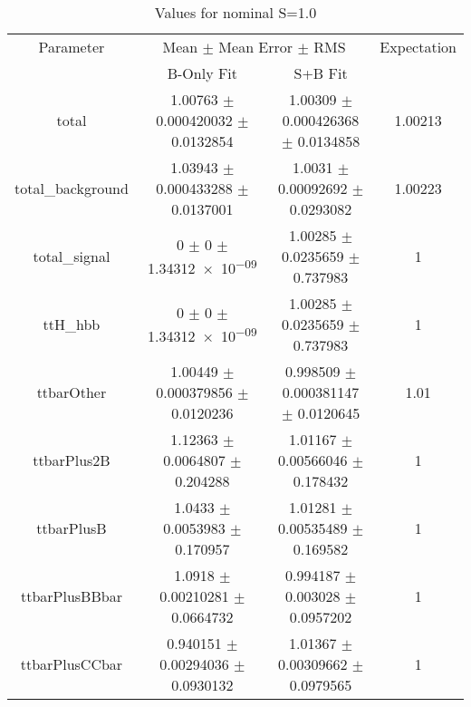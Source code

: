 \begin{table}
\centering
\caption{Values for nominal S=1.0}
\begin{tabular}{cccc}
\toprule
Parameter & \multicolumn{2}{c}{Mean $\pm$ Mean Error $\pm$ RMS} & Expectation\\
 & B-Only Fit & S+B Fit & \\
\midrule
total & \num{1.00763} $\pm$ \num{0.000420032} $\pm$ \num{0.0132854} & \num{1.00309} $\pm$ \num{0.000426368} $\pm$ \num{0.0134858} & \num{1.00213}\\
total\_background & \num{1.03943} $\pm$ \num{0.000433288} $\pm$ \num{0.0137001} & \num{1.0031} $\pm$ \num{0.00092692} $\pm$ \num{0.0293082} & \num{1.00223}\\
total\_signal & \num{0} $\pm$ \num{0} $\pm$ \num{1.34312e-09} & \num{1.00285} $\pm$ \num{0.0235659} $\pm$ \num{0.737983} & \num{1}\\
ttH\_hbb & \num{0} $\pm$ \num{0} $\pm$ \num{1.34312e-09} & \num{1.00285} $\pm$ \num{0.0235659} $\pm$ \num{0.737983} & \num{1}\\
ttbarOther & \num{1.00449} $\pm$ \num{0.000379856} $\pm$ \num{0.0120236} & \num{0.998509} $\pm$ \num{0.000381147} $\pm$ \num{0.0120645} & \num{1.01}\\
ttbarPlus2B & \num{1.12363} $\pm$ \num{0.0064807} $\pm$ \num{0.204288} & \num{1.01167} $\pm$ \num{0.00566046} $\pm$ \num{0.178432} & \num{1}\\
ttbarPlusB & \num{1.0433} $\pm$ \num{0.0053983} $\pm$ \num{0.170957} & \num{1.01281} $\pm$ \num{0.00535489} $\pm$ \num{0.169582} & \num{1}\\
ttbarPlusBBbar & \num{1.0918} $\pm$ \num{0.00210281} $\pm$ \num{0.0664732} & \num{0.994187} $\pm$ \num{0.003028} $\pm$ \num{0.0957202} & \num{1}\\
ttbarPlusCCbar & \num{0.940151} $\pm$ \num{0.00294036} $\pm$ \num{0.0930132} & \num{1.01367} $\pm$ \num{0.00309662} $\pm$ \num{0.0979565} & \num{1}\\
\bottomrule
\end{tabular}
\end{table}